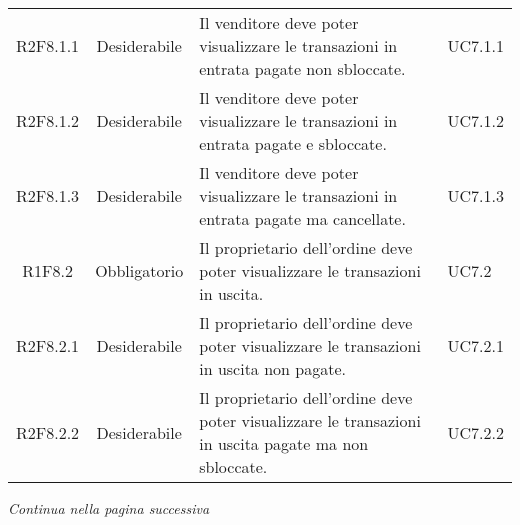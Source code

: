 \begin{table}[H]
\begin{tabular}{c | c | p{6cm} | p{4.1cm}}
        R2F8.1.1                                                          & Desiderabile & Il venditore deve poter visualizzare le transazioni in entrata pagate non sbloccate.                                  & UC7.1.1                                                  \\
        R2F8.1.2                                                          & Desiderabile & Il venditore deve poter visualizzare le transazioni in entrata pagate e sbloccate.                                    & UC7.1.2                                                  \\
        R2F8.1.3                                                          & Desiderabile & Il venditore deve poter visualizzare le transazioni in entrata pagate ma cancellate.                                  & UC7.1.3                                                  \\
        R1F8.2                                                            & Obbligatorio & Il proprietario dell'ordine deve poter visualizzare le transazioni in uscita.                                         & UC7.2                                                    \\
        R2F8.2.1                                                          & Desiderabile & Il proprietario dell'ordine deve poter visualizzare le transazioni in uscita non pagate.                              & UC7.2.1                                                  \\
        R2F8.2.2                                                          & Desiderabile & Il proprietario dell'ordine deve poter visualizzare le transazioni in uscita pagate ma non sbloccate.                 & UC7.2.2                                                  \\
    \end{tabular}
\end{table}
\begin{center}
    \textit{\small Continua nella pagina successiva}
\end{center}
